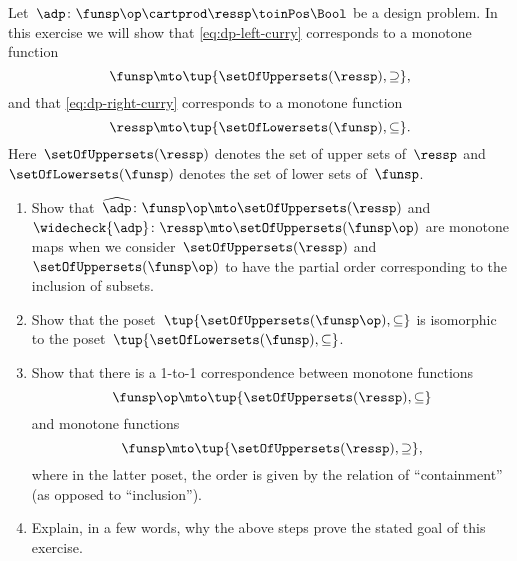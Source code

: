 \begin{gradedexercise}
    \label{ex:CurryingDesignProblems}
    Let~$\adp\colon \funsp\op \cartprod \ressp\toinPos \Bool$ be a design problem.
    In this exercise we will show that \cref{eq:dp-left-curry} corresponds to a monotone function
    \begin{equation}
        \funsp \mto \tup{\setOfUppersets (\ressp), \supseteq},
    \end{equation}
    and that \cref{eq:dp-right-curry} corresponds to a monotone function
    \begin{equation}
        \ressp \mto \tup{\setOfLowersets(\funsp), \subseteq}.
    \end{equation}
    Here~$\setOfUppersets (\ressp)$ denotes the set of upper sets of~$\ressp$ and~$\setOfLowersets(\funsp)$ denotes the set of lower sets of~$\funsp$.

    \begin{enumerate}
        \item Show that~$\widehat{\adp} \colon \funsp\op \mto \setOfUppersets (\ressp)$ and~$\widecheck{\adp} \colon \ressp \mto \setOfUppersets (\funsp\op)$ are monotone maps when we consider~$\setOfUppersets (\ressp)$ and~$\setOfUppersets (\funsp\op)$ to have the partial order corresponding to the inclusion of subsets.
        \item Show that the poset~$\tup{\setOfUppersets (\funsp\op), \subseteq}$ is isomorphic to the poset~$\tup{\setOfLowersets(\funsp), \subseteq}$.
        \item Show that there is a 1-to-1 correspondence between monotone functions
        \begin{equation}
            \funsp\op \mto \tup{\setOfUppersets (\ressp), \subseteq}
        \end{equation}
        and monotone functions
        \begin{equation}
            \funsp \mto \tup{\setOfUppersets (\ressp), \supseteq},
        \end{equation}
        where in the latter poset, the order is given by the relation of ``containment'' (as opposed to ``inclusion'').
        \item Explain, in a few words, why the above steps prove the stated goal of this exercise.
    \end{enumerate}
\end{gradedexercise}

